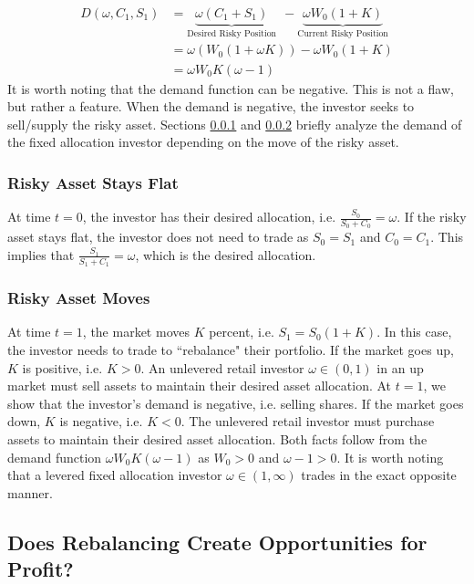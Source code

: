 \documentclass[12pt]{article}
\begin{document}
\begin{align}
D(\omega, C_1,S_1) &= \underbrace{\omega(C_1+S_1)}_{\text{Desired Risky Position}} \ \ - \underbrace{\omega W_0(1+K)}_{\text{Current Risky Position}} \nonumber \\
&= \omega(W_0(1+\omega K)) - \omega W_0(1+K) \nonumber \\
&= \omega W_0 K(\omega-1) \label{eq:fa_demand}
\end{align}
It is worth noting that the demand function can be negative. This is not a flaw, but rather a feature. When the demand is negative, the investor seeks to sell/supply the risky asset. Sections \ref{subsubsec:flat} and \ref{subsubsec:moves} briefly analyze the demand of the fixed allocation investor depending on the move of the risky asset. 

\subsubsection{Risky Asset Stays Flat} \label{subsubsec:flat}

At time $t=0$, the investor has their desired allocation, i.e. $\frac{S_0}{S_0+C_0} = \omega$. If the risky asset stays flat, the investor does not need to trade as $S_0 = S_1$ and $C_0 = C_1$. This implies that $\frac{S_1}{S_1 + C_1} = \omega$, which is the desired allocation.

\subsubsection{Risky Asset Moves} \label{subsubsec:moves}
At time $t=1$, the market moves $K$ percent, i.e. $S_1 = S_0(1+K)$. In this case, the investor needs to trade to ``rebalance" their portfolio. If the market goes up, $K$ is positive, i.e. $K > 0$. An unlevered retail investor $\omega \in (0, 1)$ in an up market must sell assets to maintain their desired asset allocation. At $t=1$, we show that the investor's demand is negative, i.e. selling shares. If the market goes down, $K$ is negative, i.e. $K<0$. The unlevered retail investor must purchase assets to maintain their desired asset allocation. Both facts follow from the demand function $\omega W_0K(\omega-1)$ as $W_0 > 0$ and $\omega-1 > 0$. It is worth noting that a levered fixed allocation investor $\omega \in (1, \infty)$ trades in the exact opposite manner.


\subsection{Does Rebalancing Create Opportunities for Profit?} \label{subsec:profit_opportunities}
\end{document}
